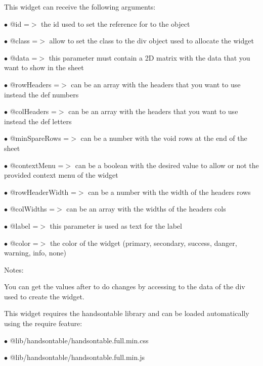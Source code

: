 \documentclass[a4paper]{book}
\begin{document}
This widget can receive the following arguments:

\begin{compactitem}
\item[\color{myblue}$\bullet$] @id             =$>$ the id used to set the reference for to the object
\item[\color{myblue}$\bullet$] @class          =$>$ allow to set the class to the div object used to allocate the widget
\item[\color{myblue}$\bullet$] @data           =$>$ this parameter must contain a 2D matrix with the data that you want to show
                   in the sheet
\item[\color{myblue}$\bullet$] @rowHeaders     =$>$ can be an array with the headers that you want to use instead the def numbers
\item[\color{myblue}$\bullet$] @colHeaders     =$>$ can be an array with the headers that you want to use instead the def letters
\item[\color{myblue}$\bullet$] @minSpareRows   =$>$ can be a number with the void rows at the end of the sheet
\item[\color{myblue}$\bullet$] @contextMenu    =$>$ can be a boolean with the desired value to allow or not the provided
                   context menu of the widget
\item[\color{myblue}$\bullet$] @rowHeaderWidth =$>$ can be a number with the width of the headers rows
\item[\color{myblue}$\bullet$] @colWidths      =$>$ can be an array with the widths of the headers cols
\item[\color{myblue}$\bullet$] @label          =$>$ this parameter is used as text for the label
\item[\color{myblue}$\bullet$] @color          =$>$ the color of the widget (primary, secondary, success, danger, warning, info, none)
\end{compactitem}

Notes:

You can get the values after to do changes by accessing to the data of the div used to create
the widget.

This widget requires the handsontable library and can be loaded automatically using the require
feature:

\begin{compactitem}
\item[\color{myblue}$\bullet$] @lib/handsontable/handsontable.full.min.css
\item[\color{myblue}$\bullet$] @lib/handsontable/handsontable.full.min.js
\end{compactitem}
\end{document}
